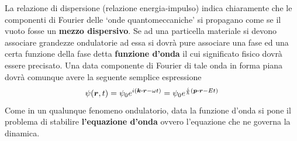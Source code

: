 La relazione di dispersione (relazione energia-impulso) indica chiaramente
che le componenti di Fourier delle `onde quantomeccaniche' si propagano
come se il vuoto fosse un \textbf{mezzo dispersivo}.
Se ad una particella materiale si devono associare grandezze ondulatorie
ad essa si dovrà pure associare una fase ed una certa funzione della
fase detta \textbf{funzione d'onda} il cui significato fisico dovrà
essere precisato.
Una data componente di Fourier di tale onda in forma
piana dovrà comunque avere la seguente semplice espressione
\begin{equation}
	\psi(\bm{r},t) = \psi_0 e^{i(\bm{k \cdot r}-\omega t)} = \psi_{0} e^{\frac{i}{\hp}(\bm{p \cdot r}-E t)}
	\label{eq:wave-function-expr}
\end{equation}
Come in un qualunque fenomeno ondulatorio, data la
funzione d'onda si pone il problema di stabilire \textbf{l'equazione
d'onda} ovvero l'equazione che ne governa la dinamica.

